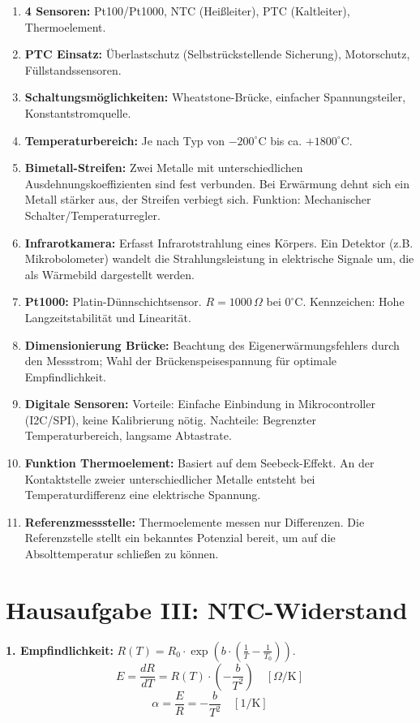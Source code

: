 \documentclass{article}
\begin{document}
\begin{enumerate}
    \item \textbf{4 Sensoren:} Pt100/Pt1000, NTC (Heißleiter), PTC (Kaltleiter), Thermoelement.
    \item \textbf{PTC Einsatz:} Überlastschutz (Selbstrückstellende Sicherung), Motorschutz, Füllstandssensoren.
    \item \textbf{Schaltungsmöglichkeiten:} Wheatstone-Brücke, einfacher Spannungsteiler, Konstantstromquelle.
    \item \textbf{Temperaturbereich:} Je nach Typ von $-200^\circ\text{C}$ bis ca. $+1800^\circ\text{C}$.
    \item \textbf{Bimetall-Streifen:} Zwei Metalle mit unterschiedlichen Ausdehnungskoeffizienten sind fest verbunden. Bei Erwärmung dehnt sich ein Metall stärker aus, der Streifen verbiegt sich. Funktion: Mechanischer Schalter/Temperaturregler.
    \item \textbf{Infrarotkamera:} Erfasst Infrarotstrahlung eines Körpers. Ein Detektor (z.B. Mikrobolometer) wandelt die Strahlungsleistung in elektrische Signale um, die als Wärmebild dargestellt werden.
    \item \textbf{Pt1000:} Platin-Dünnschichtsensor. $R = 1000\,\Omega$ bei $0^\circ\text{C}$. Kennzeichen: Hohe Langzeitstabilität und Linearität.
    \item \textbf{Dimensionierung Brücke:} Beachtung des Eigenerwärmungsfehlers durch den Messstrom; Wahl der Brückenspeisespannung für optimale Empfindlichkeit.
    \item \textbf{Digitale Sensoren:} Vorteile: Einfache Einbindung in Mikrocontroller (I2C/SPI), keine Kalibrierung nötig. Nachteile: Begrenzter Temperaturbereich, langsame Abtastrate.
    \item \textbf{Funktion Thermoelement:} Basiert auf dem Seebeck-Effekt. An der Kontaktstelle zweier unterschiedlicher Metalle entsteht bei Temperaturdifferenz eine elektrische Spannung.
    \item \textbf{Referenzmessstelle:} Thermoelemente messen nur Differenzen. Die Referenzstelle stellt ein bekanntes Potenzial bereit, um auf die Absolttemperatur schließen zu können.
\end{enumerate}

\section*{Hausaufgabe III: NTC-Widerstand}

\textbf{1. Empfindlichkeit:}
$R(T) = R_0 \cdot \exp(b \cdot (\frac{1}{T} - \frac{1}{T_0}))$.
\[ E = \frac{dR}{dT} = R(T) \cdot \left(-\frac{b}{T^2}\right) \quad [\Omega/\text{K}] \]
\[ \alpha = \frac{E}{R} = -\frac{b}{T^2} \quad [1/\text{K}] \]
\end{document}
